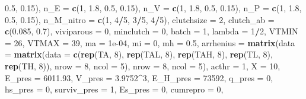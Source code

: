 \documentclass[]{article}
\newenvironment{Shaded}{\begin{snugshade}}{\end{snugshade}}
\newcommand{\KeywordTok}[1]{\textcolor[rgb]{0.13,0.29,0.53}{\textbf{#1}}}
\newcommand{\DataTypeTok}[1]{\textcolor[rgb]{0.13,0.29,0.53}{#1}}
\newcommand{\DecValTok}[1]{\textcolor[rgb]{0.00,0.00,0.81}{#1}}
\newcommand{\FloatTok}[1]{\textcolor[rgb]{0.00,0.00,0.81}{#1}}
\newcommand{\OperatorTok}[1]{\textcolor[rgb]{0.81,0.36,0.00}{\textbf{#1}}}
\newcommand{\NormalTok}[1]{#1}
\begin{document}
\begin{Shaded}
\begin{Highlighting}[]
        \FloatTok{0.5}\NormalTok{, }\FloatTok{0.15}\NormalTok{), }\DataTypeTok{n_E =} \KeywordTok{c}\NormalTok{(}\DecValTok{1}\NormalTok{, }\FloatTok{1.8}\NormalTok{, }\FloatTok{0.5}\NormalTok{, }\FloatTok{0.15}\NormalTok{), }\DataTypeTok{n_V =} \KeywordTok{c}\NormalTok{(}\DecValTok{1}\NormalTok{, }\FloatTok{1.8}\NormalTok{, }
        \FloatTok{0.5}\NormalTok{, }\FloatTok{0.15}\NormalTok{), }\DataTypeTok{n_P =} \KeywordTok{c}\NormalTok{(}\DecValTok{1}\NormalTok{, }\FloatTok{1.8}\NormalTok{, }\FloatTok{0.5}\NormalTok{, }\FloatTok{0.15}\NormalTok{), }\DataTypeTok{n_M_nitro =} \KeywordTok{c}\NormalTok{(}\DecValTok{1}\NormalTok{, }
        \DecValTok{4}\OperatorTok{/}\DecValTok{5}\NormalTok{, }\DecValTok{3}\OperatorTok{/}\DecValTok{5}\NormalTok{, }\DecValTok{4}\OperatorTok{/}\DecValTok{5}\NormalTok{), }\DataTypeTok{clutchsize =} \DecValTok{2}\NormalTok{, }\DataTypeTok{clutch_ab =} \KeywordTok{c}\NormalTok{(}\FloatTok{0.085}\NormalTok{, }
        \FloatTok{0.7}\NormalTok{), }\DataTypeTok{viviparous =} \DecValTok{0}\NormalTok{, }\DataTypeTok{minclutch =} \DecValTok{0}\NormalTok{, }\DataTypeTok{batch =} \DecValTok{1}\NormalTok{, }\DataTypeTok{lambda =} \DecValTok{1}\OperatorTok{/}\DecValTok{2}\NormalTok{, }
    \DataTypeTok{VTMIN =} \DecValTok{26}\NormalTok{, }\DataTypeTok{VTMAX =} \DecValTok{39}\NormalTok{, }\DataTypeTok{ma =} \FloatTok{1e-04}\NormalTok{, }\DataTypeTok{mi =} \DecValTok{0}\NormalTok{, }\DataTypeTok{mh =} \FloatTok{0.5}\NormalTok{, }\DataTypeTok{arrhenius =} \KeywordTok{matrix}\NormalTok{(}\DataTypeTok{data =} \KeywordTok{matrix}\NormalTok{(}\DataTypeTok{data =} \KeywordTok{c}\NormalTok{(}\KeywordTok{rep}\NormalTok{(TA, }
        \DecValTok{8}\NormalTok{), }\KeywordTok{rep}\NormalTok{(TAL, }\DecValTok{8}\NormalTok{), }\KeywordTok{rep}\NormalTok{(TAH, }\DecValTok{8}\NormalTok{), }\KeywordTok{rep}\NormalTok{(TL, }\DecValTok{8}\NormalTok{), }\KeywordTok{rep}\NormalTok{(TH, }\DecValTok{8}\NormalTok{)), }
        \DataTypeTok{nrow =} \DecValTok{8}\NormalTok{, }\DataTypeTok{ncol =} \DecValTok{5}\NormalTok{), }\DataTypeTok{nrow =} \DecValTok{8}\NormalTok{, }\DataTypeTok{ncol =} \DecValTok{5}\NormalTok{), }\DataTypeTok{acthr =} \DecValTok{1}\NormalTok{, }
    \DataTypeTok{X =} \DecValTok{10}\NormalTok{, }\DataTypeTok{E_pres =} \FloatTok{6011.93}\NormalTok{, }\DataTypeTok{V_pres =} \FloatTok{3.9752}\OperatorTok{^}\DecValTok{3}\NormalTok{, }\DataTypeTok{E_H_pres =} \DecValTok{73592}\NormalTok{, }
    \DataTypeTok{q_pres =} \DecValTok{0}\NormalTok{, }\DataTypeTok{hs_pres =} \DecValTok{0}\NormalTok{, }\DataTypeTok{surviv_pres =} \DecValTok{1}\NormalTok{, }\DataTypeTok{Es_pres =} \DecValTok{0}\NormalTok{, }\DataTypeTok{cumrepro =} \DecValTok{0}\NormalTok{, }

\end{Highlighting}
\end{Shaded}
\end{document}
